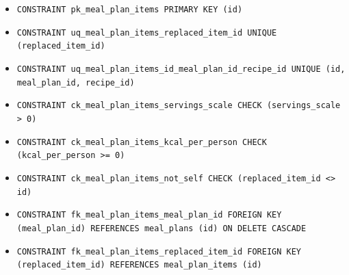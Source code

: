 \begin{itemize}
\item \raggedright {\small\texttt{CONSTRAINT pk\_\allowbreak{}\allowbreak{}meal\_\allowbreak{}\allowbreak{}plan\_\allowbreak{}\allowbreak{}items PRIMARY KEY (id)}}
\item \raggedright {\small\texttt{CONSTRAINT uq\_\allowbreak{}\allowbreak{}meal\_\allowbreak{}\allowbreak{}plan\_\allowbreak{}\allowbreak{}items\_\allowbreak{}\allowbreak{}replaced\_\allowbreak{}\allowbreak{}item\_\allowbreak{}\allowbreak{}id UNIQUE (replaced\_\allowbreak{}\allowbreak{}item\_\allowbreak{}\allowbreak{}id)}}
\item \raggedright {\small\texttt{CONSTRAINT uq\_\allowbreak{}\allowbreak{}meal\_\allowbreak{}\allowbreak{}plan\_\allowbreak{}\allowbreak{}items\_\allowbreak{}\allowbreak{}id\_\allowbreak{}\allowbreak{}meal\_\allowbreak{}\allowbreak{}plan\_\allowbreak{}\allowbreak{}id\_\allowbreak{}\allowbreak{}recipe\_\allowbreak{}\allowbreak{}id UNIQUE (id, meal\_\allowbreak{}\allowbreak{}plan\_\allowbreak{}\allowbreak{}id, recipe\_\allowbreak{}\allowbreak{}id)}}
\item \raggedright {\small\texttt{CONSTRAINT ck\_\allowbreak{}\allowbreak{}meal\_\allowbreak{}\allowbreak{}plan\_\allowbreak{}\allowbreak{}items\_\allowbreak{}\allowbreak{}servings\_\allowbreak{}\allowbreak{}scale CHECK (servings\_\allowbreak{}\allowbreak{}scale > 0)}}
\item \raggedright {\small\texttt{CONSTRAINT ck\_\allowbreak{}\allowbreak{}meal\_\allowbreak{}\allowbreak{}plan\_\allowbreak{}\allowbreak{}items\_\allowbreak{}\allowbreak{}kcal\_\allowbreak{}\allowbreak{}per\_\allowbreak{}\allowbreak{}person CHECK (kcal\_\allowbreak{}\allowbreak{}per\_\allowbreak{}\allowbreak{}person >= 0)}}
\item \raggedright {\small\texttt{CONSTRAINT ck\_\allowbreak{}\allowbreak{}meal\_\allowbreak{}\allowbreak{}plan\_\allowbreak{}\allowbreak{}items\_\allowbreak{}\allowbreak{}not\_\allowbreak{}\allowbreak{}self CHECK (replaced\_\allowbreak{}\allowbreak{}item\_\allowbreak{}\allowbreak{}id <> id)}}
\item \raggedright {\small\texttt{CONSTRAINT fk\_\allowbreak{}\allowbreak{}meal\_\allowbreak{}\allowbreak{}plan\_\allowbreak{}\allowbreak{}items\_\allowbreak{}\allowbreak{}meal\_\allowbreak{}\allowbreak{}plan\_\allowbreak{}\allowbreak{}id FOREIGN KEY (meal\_\allowbreak{}\allowbreak{}plan\_\allowbreak{}\allowbreak{}id) REFERENCES meal\_\allowbreak{}\allowbreak{}plans (id) ON DELETE CASCADE}}
\item \raggedright {\small\texttt{CONSTRAINT fk\_\allowbreak{}\allowbreak{}meal\_\allowbreak{}\allowbreak{}plan\_\allowbreak{}\allowbreak{}items\_\allowbreak{}\allowbreak{}replaced\_\allowbreak{}\allowbreak{}item\_\allowbreak{}\allowbreak{}id FOREIGN KEY (replaced\_\allowbreak{}\allowbreak{}item\_\allowbreak{}\allowbreak{}id) REFERENCES meal\_\allowbreak{}\allowbreak{}plan\_\allowbreak{}\allowbreak{}items (id)}}

\end{itemize}
